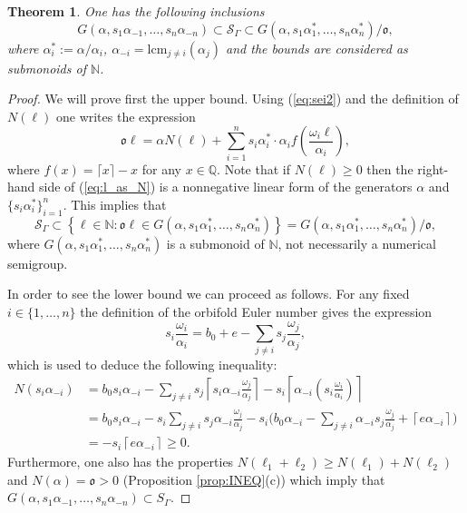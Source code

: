 \documentclass[oneside]{amsart}
\numberwithin{equation}{section}
\numberwithin{equation}{subsection}
\theoremstyle{plain}
\newtheorem{thm}[equation]{Theorem}
\theoremstyle{definition}
\newcommand{\cl}{\check{\ell}}
\newcommand{\w}{\omega}
\newcommand{\al}{\alpha}
\newcommand{\Se}{\mathcal{S}}
\newcommand{\G}{\Gamma}
\newcommand{\oo}{\mathfrak{o}}
\newcommand{\h}[1]{\left\lbrace{#1}\right\rbrace}
\begin{document}
   \begin{thm}\label{thm:numbound}
       One has the following inclusions
       \begin{equation}\label{eq:incl}
        G(\al,s_1 \al_{-1},\dots, s_n \al_{-n})\subset \Se_\G
        \subset G(\al,s_1 \al^*_1,\dots,s_n \al^*_n)/\oo,
        \end{equation}
        where $\al^*_i:=\al/\al_i$, $\al_{-i}=\mathrm{lcm}_{j\neq i}(\al_j)$ and the bounds are considered as submonoids of $\mathbb{N}$.
   \end{thm}
   \begin{proof}
       We will prove first the upper bound.  Using (\ref{eq:sei2}) and the definition of $N(\ell)$  one writes the expression 
       \begin{equation}
           \label{eq:l_as_N}
           \oo \ell=\alpha N(\ell)+\sum_{i=1}^n  s_i \al^*_i \cdot \al_i f\left(\frac{\w_i \ell}{\al_i}\right),
       \end{equation} 
       where $f(x)=\lceil x\rceil-x$ for any $x\in \mathbb{Q}$.
       Note that if $N(\ell)\geq 0$ then the right-hand side 
       of (\ref{eq:l_as_N}) is a nonnegative linear form of the generators  $\al$ and $\{s_i\al^*_i\}_{i=1}^n$. This implies that  
       \[
        \Se_{\G}\subset\h{\ell\in\mathbb{N}:\oo \ell\in G(\al,s_1 \al^*_1,\dots,s_n \al^*_n)}=
        G(\al,s_1 \al^*_1,\dots,s_n \al^*_n)/\oo, 
       \]
where $G(\al,s_1 \al^*_1,\dots,s_n \al^*_n)$ is  a submonoid of $\mathbb{N}$, not necessarily a numerical semigroup. 

In order to see the lower bound we can proceed as follows. For any fixed $i\in \{1,\dots,n\}$ the definition of the orbifold Euler number gives the expression
        \[
        s_i \frac{\w_i}{\al_i}=b_0+e-\sum_{j\neq i} s_j \frac{\w_j}{\al_j},
         \]
which is used to deduce the following inequality:
        \begin{align*}
            N(s_i\al_{-i})&=b_0 s_i\al_{-i}-
            \sum\limits_{j\neq i}s_j\left\lceil s_i \al_{-i}\frac{\w_j}{\al_j}\right\rceil -s_i\left\lceil\al_{-i} \left(s_i\frac{\omega_i}{\al_i}\right)\right\rceil\\       
            &=b_0 s_i \al_{-i}-
            s_i\sum\limits_{j\neq i} s_j \al_{-i} \frac{\w_j}{\al_j}
            -s_i\Big(b_0 \al_{-i}-\sum\limits_{j\neq i} \al_{-i} s_j\frac{\w_j}{\al_j}
            + \left\lceil e \al_{-i}\right\rceil\Big)\\
            &=-s_i\left\lceil e \al_{-i}\right\rceil\ge 0.
        \end{align*}
Furthermore, one also has the properties $N(\ell_1+\ell_2)\geq N(\ell_1)+N(\ell_2)$ and $N(\al)=\oo>0$ (Proposition \ref{prop:INEQ}(c)) which imply that $G(\al, s_1\al_{-1},\dots,s_n\al_{-n})\subset S_{\Gamma}$.       
   \end{proof}
   
\end{document}
